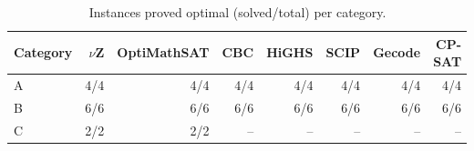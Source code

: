 \begin{table}[t]
\centering
\caption{Instances proved optimal (solved/total) per category.}
\label{tab:exp-solved}
\small
\begin{tabular}{@{}lrrrrrrr@{}}
\toprule
Category & $\nu$Z & OptiMathSAT & CBC & HiGHS & SCIP & Gecode & CP-SAT \\
\midrule
A & 4/4 & 4/4 & 4/4 & 4/4 & 4/4 & 4/4 & 4/4 \\
B & 6/6 & 6/6 & 6/6 & 6/6 & 6/6 & 6/6 & 6/6 \\
C & 2/2 & 2/2 & -- & -- & -- & -- & -- \\
\bottomrule
\end{tabular}
\end{table}
